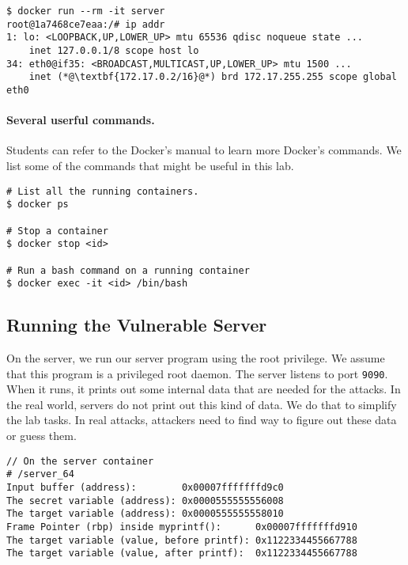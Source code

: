 \begin{lstlisting}
$ docker run --rm -it server 
root@1a7468ce7eaa:/# ip addr
1: lo: <LOOPBACK,UP,LOWER_UP> mtu 65536 qdisc noqueue state ...
    inet 127.0.0.1/8 scope host lo
34: eth0@if35: <BROADCAST,MULTICAST,UP,LOWER_UP> mtu 1500 ...
    inet (*@\textbf{172.17.0.2/16}@*) brd 172.17.255.255 scope global eth0
\end{lstlisting}


\paragraph{Several userful commands.}
Students can refer to the Docker's manual to learn more Docker's commands. 
We list some of the commands that might be useful in this lab. 

\begin{lstlisting}
# List all the running containers. 
$ docker ps 

# Stop a container 
$ docker stop <id>

# Run a bash command on a running container 
$ docker exec -it <id> /bin/bash
\end{lstlisting}
 


\subsection{Running the Vulnerable Server} 

On the server, we run our server program using the root privilege. We
assume that this program is a privileged root daemon. The server listens to
port \texttt{9090}. When it runs,  it prints out some internal data 
that are needed for the attacks. In the real world, servers do not 
print out this kind of data. We do that to simplify the lab tasks. 
In real attacks, attackers need to find way to figure out these data
or guess them. 

\begin{lstlisting}
// On the server container
# /server_64
Input buffer (address):        0x00007fffffffd9c0
The secret variable (address): 0x0000555555556008
The target variable (address): 0x0000555555558010
Frame Pointer (rbp) inside myprintf():      0x00007fffffffd910
The target variable (value, before printf): 0x1122334455667788
The target variable (value, after printf):  0x1122334455667788
\end{lstlisting}


